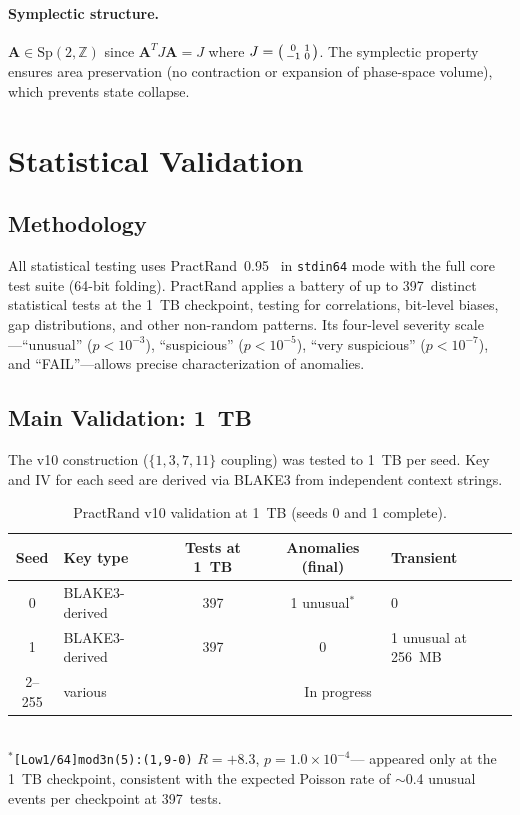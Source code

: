 \documentclass[runningheads]{llncs}
\newcommand{\catmap}{\mathbf{A}}
\begin{document}
\paragraph{Symplectic structure.}
$\catmap \in \mathrm{Sp}(2, \mathbb{Z})$ since $\catmap^T J \catmap = J$
where $J = \begin{psmallmatrix}0&1\\-1&0\end{psmallmatrix}$.
The symplectic property ensures area preservation (no contraction or
expansion of phase-space volume), which prevents state collapse.

\section{Statistical Validation}
\label{sec:validation}

\subsection{Methodology}

All statistical testing uses PractRand~0.95~\cite{practrand} in \texttt{stdin64}
mode with the full core test suite (64-bit folding).  PractRand applies a
battery of up to 397~distinct statistical tests at the 1~TB checkpoint,
testing for correlations, bit-level biases, gap distributions, and other
non-random patterns.  Its four-level severity scale---``unusual'' ($p < 10^{-3}$),
``suspicious'' ($p < 10^{-5}$), ``very suspicious'' ($p < 10^{-7}$), and
``FAIL''---allows precise characterization of anomalies.

\subsection{Main Validation: 1~TB}

The v10 construction ($\{1,3,7,11\}$ coupling) was tested to 1~TB per seed.
Key and IV for each seed are derived via BLAKE3 from independent context strings.

\begin{table}[h]
\centering
\caption{PractRand v10 validation at 1~TB (seeds 0 and 1 complete).}
\label{tab:practrand-1tb}
\begin{tabular}{@{}clccl@{}}
\toprule
Seed & Key type & Tests at 1~TB & Anomalies (final) & Transient \\
\midrule
0 & BLAKE3-derived & 397 & 1 unusual$^*$ & 0 \\
1 & BLAKE3-derived & 397 & 0 & 1 unusual at 256~MB \\
2--255 & various & \multicolumn{3}{c}{In progress} \\
\bottomrule
\end{tabular}
\\[4pt]
{\footnotesize $^*$\texttt{[Low1/64]mod3n(5):(1,9-0)} $R = +8.3$, $p = 1.0 \times 10^{-4}$---
appeared only at the 1~TB checkpoint, consistent with the expected
Poisson rate of $\sim$0.4 unusual events per checkpoint at 397~tests.}
\end{table}
\end{document}
